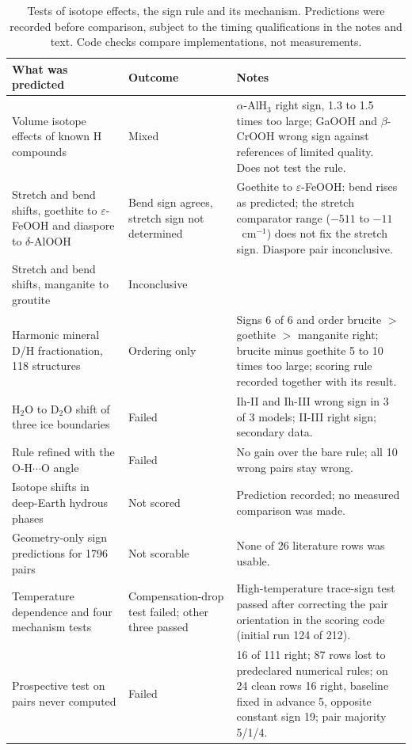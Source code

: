 \documentclass[aps,prmaterials,reprint,superscriptaddress,nofootinbib]{revtex4-2}
\begin{document}
\begin{table}[t]
\caption{Tests of isotope effects, the sign rule and its mechanism. Predictions were recorded before comparison, subject to the timing qualifications in the notes and text. Code checks compare implementations, not measurements.}
\label{tab:tests}
\begin{ruledtabular}
\begin{tabular}{p{}p{}p{}}
What was predicted & Outcome & Notes \\
\hline
Volume isotope effects of known H compounds & Mixed & $\alpha$-AlH$_3$ right sign, 1.3 to 1.5 times too large; GaOOH and $\beta$-CrOOH wrong sign against references of limited quality. Does not test the rule. \\
Stretch and bend shifts, goethite to $\varepsilon$-FeOOH and diaspore to $\delta$-AlOOH & Bend sign agrees, stretch sign not determined & Goethite to $\varepsilon$-FeOOH: bend rises as predicted; the stretch comparator range ($-511$ to $-11$~cm$^{-1}$) does not fix the stretch sign. Diaspore pair inconclusive. \\
Stretch and bend shifts, manganite to groutite & Inconclusive & \\
Harmonic mineral D/H fractionation, 118 structures & Ordering only & Signs 6 of 6 and order brucite $>$ goethite $>$ manganite right; brucite minus goethite 5 to 10 times too large; scoring rule recorded together with its result. \\
H$_2$O to D$_2$O shift of three ice boundaries & Failed & Ih-II and Ih-III wrong sign in 3 of 3 models; II-III right sign; secondary data. \\
Rule refined with the O-H$\cdots$O angle & Failed & No gain over the bare rule; all 10 wrong pairs stay wrong. \\
Isotope shifts in deep-Earth hydrous phases & Not scored & Prediction recorded; no measured comparison was made. \\
Geometry-only sign predictions for 1796 pairs & Not scorable & None of 26 literature rows was usable. \\
Temperature dependence and four mechanism tests & Compensation-drop test failed; other three passed & High-temperature trace-sign test passed after correcting the pair orientation in the scoring code (initial run 124 of 212). \\
Prospective test on pairs never computed & Failed & 16 of 111 right; 87 rows lost to predeclared numerical rules; on 24 clean rows 16 right, baseline fixed in advance 5, opposite constant sign 19; pair majority 5/1/4. \\

\end{tabular}
\end{ruledtabular}
\end{table}
\end{document}
